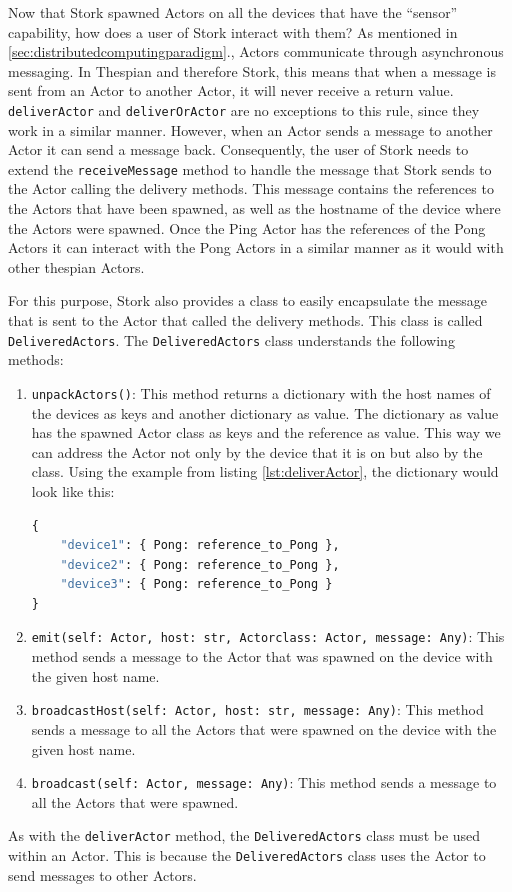 \documentclass[a4paper]{article}
\newcommand{\secref}[1]{\autoref{#1}.}
\begin{document}
Now that Stork spawned Actors on all the devices that have the \enquote{sensor} capability, how does a user of Stork interact with them? As mentioned in \secref{sec:distributedcomputingparadigm}, Actors communicate through asynchronous messaging. In Thespian and therefore Stork, this means that when a message is sent from an Actor to another Actor, it will never receive a return value. \lstinline|deliverActor| and \lstinline|deliverOrActor| are no exceptions to this rule, since they work in a similar manner. However, when an Actor sends a message to another Actor it can send a message back. Consequently, the user of Stork needs to extend the \lstinline|receiveMessage| method to handle the message that Stork sends to the Actor calling the delivery methods. This message contains the references to the Actors that have been spawned, as well as the hostname of the device where the Actors were spawned. Once the Ping Actor has the references of the Pong Actors it can interact with the Pong Actors in a similar manner as it would with other thespian Actors.

For this purpose, Stork also provides a class to easily encapsulate the message that is sent to the Actor that called the delivery methods. This class is called \lstinline|DeliveredActors|. The \lstinline|DeliveredActors| class understands the following methods:
\begin{enumerate}
    \item \lstinline{unpackActors()}: This method returns a dictionary with the host names of the devices as keys and another dictionary as value. The dictionary as value has the spawned Actor class as keys and the reference as value. This way we can address the Actor not only by the device that it is on but also by the class. Using the example from listing \ref{lst:deliverActor}, the dictionary would look like this:
          \begin{lstlisting}[language=Python]
{
    "device1": { Pong: reference_to_Pong },
    "device2": { Pong: reference_to_Pong },
    "device3": { Pong: reference_to_Pong }
}
    \end{lstlisting}
    \item \lstinline{emit(self: Actor, host: str, Actorclass: Actor, message: Any)}: This method sends a message to the Actor that was spawned on the device with the given host name.
    \item \lstinline{broadcastHost(self: Actor, host: str, message: Any)}: This method sends a message to all the Actors that were spawned on the device with the given host name.
    \item \lstinline{broadcast(self: Actor, message: Any)}: This method sends a message to all the Actors that were spawned.
\end{enumerate}
As with the \lstinline|deliverActor| method, the \lstinline|DeliveredActors| class must be used within an Actor. This is because the \lstinline|DeliveredActors| class uses the Actor to send messages to other Actors.
\end{document}
